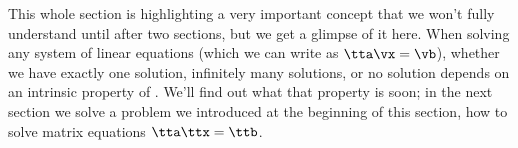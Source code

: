 This whole section is highlighting a very important concept that we won't fully understand until after two sections, but we get a glimpse of it here. When solving any system of linear equations (which we can write as $\tta\vx = \vb$), whether we have exactly one solution, infinitely many solutions, or no solution depends on an intrinsic property of \tta. We'll find out what that property is soon; in the next section we solve a problem we introduced at the beginning of this section, how to solve matrix equations $\tta\ttx=\ttb$.






